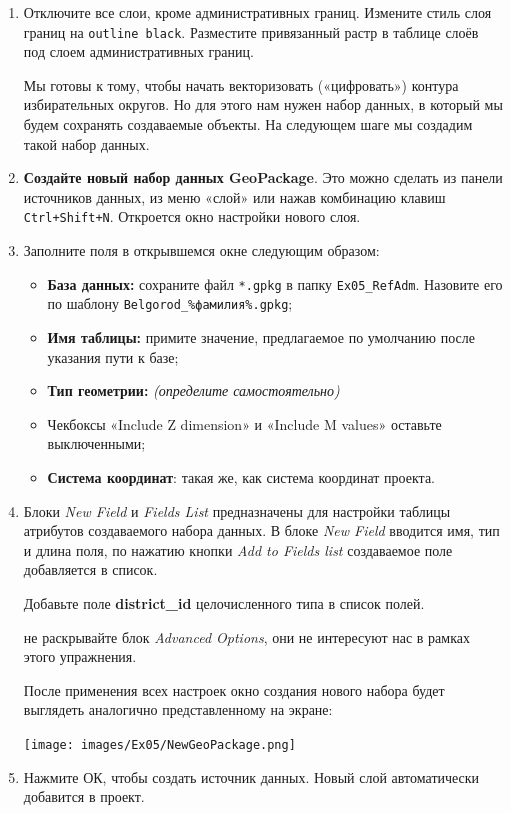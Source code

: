 \documentclass[
  12pt,
]{book}
\providecommand{\tightlist}{%
  \setlength{\itemsep}{0pt}\setlength{\parskip}{0pt}}
\begin{document}
\begin{enumerate}
\def\labelenumi{\arabic{enumi}.}
\item
  Отключите все слои, кроме административных границ. Измените стиль слоя границ на \texttt{outline\ black}. Разместите привязанный растр в таблице слоёв под слоем административных границ.

  Мы готовы к тому, чтобы начать векторизовать («цифровать») контура избирательных округов. Но для этого нам нужен набор данных, в который мы будем сохранять создаваемые объекты. На следующем шаге мы создадим такой набор данных.
\item
  \textbf{Создайте новый набор данных GeoPackage}. Это можно сделать из панели источников данных, из меню «слой» или нажав комбинацию клавиш \texttt{Ctrl+Shift+N}. Откроется окно настройки нового слоя.
\item
  Заполните поля в открывшемся окне следующим образом:

  \begin{itemize}
  \tightlist
  \item
    \textbf{База данных:} сохраните файл \texttt{*.gpkg} в папку \texttt{Ex05\_RefAdm}. Назовите его по шаблону \texttt{Belgorod\_\%фамилия\%.gpkg};
  \item
    \textbf{Имя таблицы:} примите значение, предлагаемое по умолчанию после указания пути к базе;
  \item
    \textbf{Тип геометрии:} \emph{(определите самостоятельно)}
  \item
    Чекбоксы «Include Z dimension» и «Include M values» оставьте выключенными;
  \item
    \textbf{Система координат}: такая же, как система координат проекта.
  \end{itemize}
\item
  Блоки \emph{New Field} и \emph{Fields List} предназначены для настройки таблицы атрибутов создаваемого набора данных. В блоке \emph{New Field} вводится имя, тип и длина поля, по нажатию кнопки \emph{Add to Fields list} создаваемое поле добавляется в список.

  Добавьте поле \textbf{district\_id} целочисленного типа в список полей.

  не раскрывайте блок \emph{Advanced Options}, они не интересуют нас в рамках этого упражнения.

  После применения всех настроек окно создания нового набора будет выглядеть аналогично представленному на экране:

  \texttt{[image: images/Ex05/NewGeoPackage.png]}
\item
  Нажмите ОК, чтобы создать источник данных. Новый слой автоматически добавится в проект.


\end{enumerate}
\end{document}
